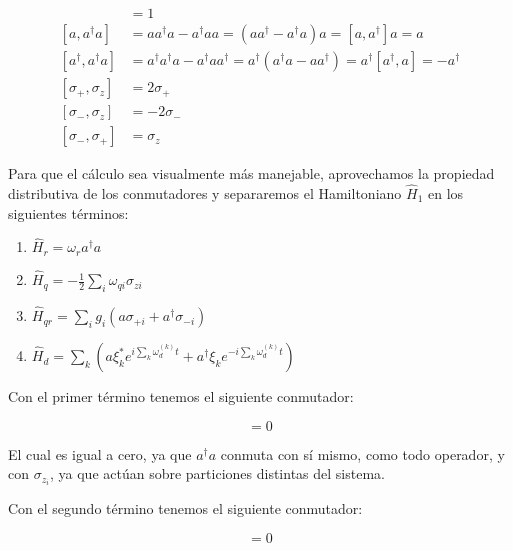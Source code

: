 \begin{align}
    [a, a^\dagger] &= 1
    \label{eq:a_ad} \\
    [a, a^\dagger a] &= a a^\dagger a - a^\dagger a a = (a a^\dagger - a^\dagger a) a = [a, a^\dagger] a = a
    \label{eq:a_ada} \\
    [a^\dagger, a^\dagger a] &= a^\dagger a^\dagger a - a^\dagger a a^\dagger = a^\dagger (a^\dagger a - a a^\dagger) = a^\dagger [a^\dagger, a] = -a^\dagger
    \label{eq:ad_ada} \\
    [\sigma_+, \sigma_z] &= 2 \sigma_+
    \label{eq:sp_sz} \\
    [\sigma_-, \sigma_z] &= - 2 \sigma_-
    \label{eq:sm_sz} \\
    [\sigma_-, \sigma_+] &= \sigma_z
    \label{eq:sm_sp}
\end{align}

Para que el cálculo sea visualmente más manejable, aprovechamos la propiedad distributiva de los conmutadores y separaremos el Hamiltoniano $\hat{H}_1$ en los siguientes términos:

\begin{enumerate}
    \item $\hat{H}_r = \omega_r a^\dag a$
    \item $\hat{H}_q = - \frac{1}{2} \sum\limits_i \omega_{qi} \sigma_{zi}$
    \item $\hat{H}_{qr} = \sum\limits_i g_i (a \sigma_{+ i} + a^\dagger \sigma_{- i})$
    \item $\hat{H}_d = \sum\limits_k (a\xi_k^*e^{i\sum\limits_k \omega_d^{(k)}t}+ a^\dagger\xi_ke^{-i\sum\limits_k \omega_d^{(k)}t})$
\end{enumerate}


Con el primer término tenemos el siguiente conmutador:

\begin{equation}
    [\omega_r a^\dag a, \sum\limits_n-i \omega_d^{(n)} t(a^\dagger a - \frac{1}{2} \sum\limits_i \sigma_{z i})] = 0
\end{equation}

El cual es igual a cero, ya que $a^\dagger a$ conmuta con sí mismo, como todo operador, y con $\sigma_{z_i}$, ya que actúan sobre particiones distintas del sistema.

Con el segundo término tenemos el siguiente conmutador:

\begin{equation}
    [- \frac{1}{2} \sum\limits_i \omega_{qi} \sigma_{zi} , \sum\limits_n-i \omega_d^{(n)} t(a^\dagger a - \frac{1}{2} \sum\limits_i \sigma_{z i})] = 0
\end{equation}

